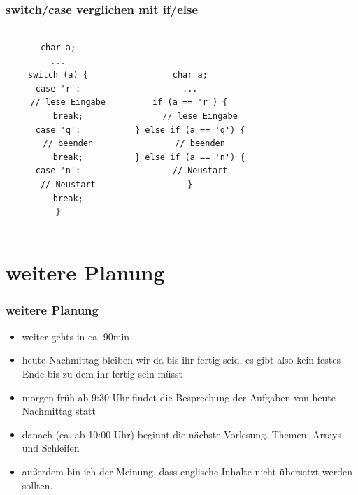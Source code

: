 \documentclass[final]{beamer}
\begin{document}
\begin{frame}[containsverbatim]
\frametitle{switch/case verglichen mit if/else}
	\begin{tabular}{c c c c}
	\begin{lstlisting}
char a;
...
switch (a) {
case 'r':
	// lese Eingabe
	break;
case 'q':
	// beenden
	break;
case 'n':
	// Neustart
	break;
}
	\end{lstlisting} 

& & &
	
	\begin{lstlisting}
char a;
...
if (a == 'r') {
	// lese Eingabe
} else if (a == 'q') {
	// beenden
} else if (a == 'n') {
	// Neustart
}
	\end{lstlisting}\\
	\end{tabular}
\end{frame}

\section{weitere Planung}
\begin{frame}
\frametitle{weitere Planung}
  \begin{itemize}
	\item{weiter gehts in ca. 90min}
	\item{heute Nachmittag bleiben wir da bis ihr fertig seid, es gibt also kein festes Ende bis zu dem ihr fertig sein müsst}
	\item{morgen früh ab 9:30 Uhr findet die Besprechung der Aufgaben von heute Nachmittag statt}
	\item{danach (ca. ab 10:00 Uhr) beginnt die nächste Vorlesung. Themen: Arrays und Schleifen}
	\item{außerdem bin ich der Meinung, dass englische Inhalte nicht übersetzt werden sollten.}
  \end{itemize}
\end{frame}
\end{document}
